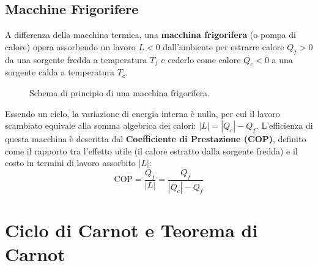 \subsection{Macchine Frigorifere}
A differenza della macchina termica, una \textbf{macchina frigorifera} (o pompa di calore) opera assorbendo un lavoro $L < 0$ dall'ambiente per estrarre calore $Q_f > 0$ da una sorgente fredda a temperatura $T_f$ e cederlo come calore $Q_c < 0$ a una sorgente calda a temperatura $T_c$.

\begin{figure}[ht]
\centering
{}
\caption{Schema di principio di una macchina frigorifera.}
\end{figure}

Essendo un ciclo, la variazione di energia interna è nulla, per cui il lavoro scambiato equivale alla somma algebrica dei calori: $|L| = |Q_c| - Q_f$.
L'efficienza di questa macchina è descritta dal \textbf{Coefficiente di Prestazione (COP)}, definito come il rapporto tra l'effetto utile (il calore estratto dalla sorgente fredda) e il costo in termini di lavoro assorbito $|L|$:
\begin{equation}
    \text{COP} = \frac{Q_f}{|L|} = \frac{Q_f}{|Q_c| - Q_f}
\end{equation}

\section{Ciclo di Carnot e Teorema di Carnot}

